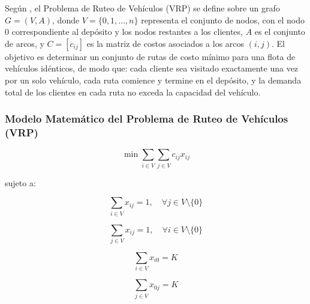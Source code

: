 \documentclass[12pt,titlepage,twoside,openright]{book}
\begin{document}
Según \citep{toth2014}, el Problema de Ruteo de Vehículos (VRP) se define sobre un grafo $G = (V, A)$, donde $V = \{0, 1, \dots, n\}$ representa el conjunto de nodos, con el nodo $0$ correspondiente al depósito y los nodos restantes a los clientes, $A$ es el conjunto de arcos, y $C = [c_{ij}]$ es la matriz de costos asociados a los arcos $(i, j)$. El objetivo es determinar un conjunto de rutas de costo mínimo para una flota de vehículos idénticos, de modo que: cada cliente sea visitado exactamente una vez por un solo vehículo, cada ruta comience y termine en el depósito, y la demanda total de los clientes en cada ruta no exceda la capacidad del vehículo.

\subsubsection*{Modelo Matemático del Problema de Ruteo de Vehículos (VRP)}

\begin{equation}
	\min \sum_{i \in V} \sum_{j \in V} c_{ij} x_{ij}
	\label{eq:VRP_obj}
\end{equation}

sujeto a:

\begin{equation}
	\sum_{i \in V} x_{ij} = 1, \quad \forall j \in V \setminus \{0\}
	\label{eq:VRP_in}
\end{equation}

\begin{equation}
	\sum_{j \in V} x_{ij} = 1, \quad \forall i \in V \setminus \{0\}
	\label{eq:VRP_out}
\end{equation}

\begin{equation}
	\sum_{i \in V} x_{i0} = K
	\label{eq:VRP_into_depot}
\end{equation}

\begin{equation}
	\sum_{j \in V} x_{0j} = K
	\label{eq:VRP_from_depot}
\end{equation}
\end{document}
